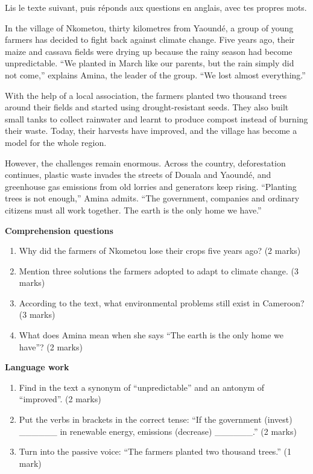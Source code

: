 \documentclass[11pt]{article}
\begin{document}
\begin{exercice}
Lis le texte suivant, puis réponds aux questions en anglais, avec tes propres mots.

\begin{textebox}
In the village of Nkometou, thirty kilometres from Yaoundé, a group of young farmers has decided to fight back against climate change. Five years ago, their maize and cassava fields were drying up because the rainy season had become unpredictable. “We planted in March like our parents, but the rain simply did not come,” explains Amina, the leader of the group. “We lost almost everything.”

With the help of a local association, the farmers planted two thousand trees around their fields and started using drought-resistant seeds. They also built small tanks to collect rainwater and learnt to produce compost instead of burning their waste. Today, their harvests have improved, and the village has become a model for the whole region.

However, the challenges remain enormous. Across the country, deforestation continues, plastic waste invades the streets of Douala and Yaoundé, and greenhouse gas emissions from old lorries and generators keep rising. “Planting trees is not enough,” Amina admits. “The government, companies and ordinary citizens must all work together. The earth is the only home we have.”
\end{textebox}

\textbf{Comprehension questions}
\begin{enumerate}
\item Why did the farmers of Nkometou lose their crops five years ago? (2 marks)
\item Mention three solutions the farmers adopted to adapt to climate change. (3 marks)
\item According to the text, what environmental problems still exist in Cameroon? (3 marks)
\item What does Amina mean when she says “The earth is the only home we have”? (2 marks)
\end{enumerate}

\textbf{Language work}
\begin{enumerate}
\item Find in the text a synonym of “unpredictable” and an antonym of “improved”. (2 marks)
\item Put the verbs in brackets in the correct tense: “If the government (invest) \_\_\_\_\_\_ in renewable energy, emissions (decrease) \_\_\_\_\_\_.” (2 marks)
\item Turn into the passive voice: “The farmers planted two thousand trees.” (1 mark)
\end{enumerate}
\end{exercice}
\end{document}
